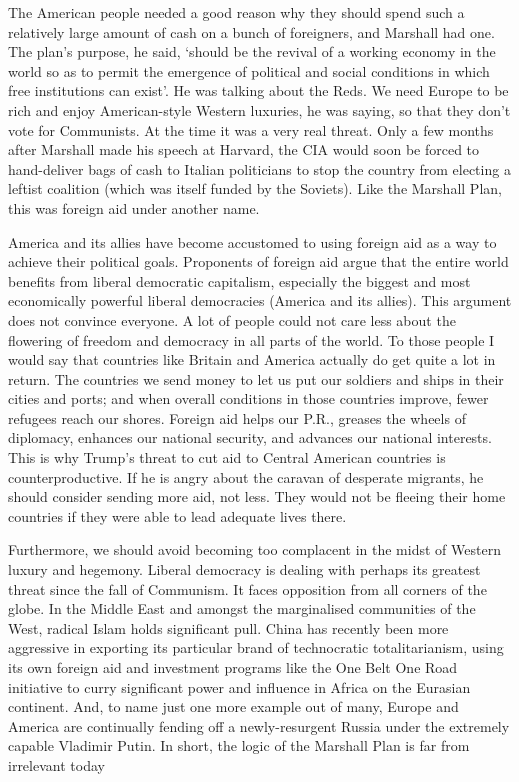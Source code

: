    The American people needed a good reason why they should spend such a
   relatively large amount of cash on a bunch of foreigners, and Marshall
   had one. The plan's purpose, he said, `should be the revival of a
   working economy in the world so as to permit the emergence of political
   and social conditions in which free institutions can exist'. He was
   talking about the Reds. We need Europe to be rich and enjoy
   American-style Western luxuries, he was saying, so that they don't vote
   for Communists. At the time it was a very real threat. Only a few
   months after Marshall made his speech at Harvard, the CIA would soon be
   forced to hand-deliver bags of cash to Italian politicians to stop the
   country from electing a leftist coalition (which was itself funded by
   the Soviets). Like the Marshall Plan, this was foreign aid under
   another name.

   America and its allies have become accustomed to using foreign aid as a
   way to achieve their political goals. Proponents of foreign aid argue
   that the entire world benefits from liberal democratic capitalism,
   especially the biggest and most economically powerful liberal
   democracies (America and its allies). This argument does not convince
   everyone. A lot of people could not care less about the flowering of
   freedom and democracy in all parts of the world. To those people I
   would say that countries like Britain and America actually do get quite
   a lot in return. The countries we send money to let us put our soldiers
   and ships in their cities and ports; and when overall conditions in
   those countries improve, fewer refugees reach our shores. Foreign aid
   helps our P.R., greases the wheels of diplomacy, enhances our national
   security, and advances our national interests. This is why Trump's
   threat to cut aid to Central American countries is counterproductive.
   If he is angry about the caravan of desperate migrants, he should
   consider sending more aid, not less. They would not be fleeing their
   home countries if they were able to lead adequate lives there.

   Furthermore, we should avoid becoming too complacent in the midst of
   Western luxury and hegemony. Liberal democracy is dealing with perhaps
   its greatest threat since the fall of Communism. It faces opposition
   from all corners of the globe. In the Middle East and amongst the
   marginalised communities of the West, radical Islam holds significant
   pull. China has recently been more aggressive in exporting its
   particular brand of technocratic totalitarianism, using its own foreign
   aid and investment programs like the One Belt One Road initiative to
   curry significant power and influence in Africa on the Eurasian
   continent. And, to name just one more example out of many, Europe and
   America are continually fending off a newly-resurgent Russia under the
   extremely capable Vladimir Putin. In short, the logic of the Marshall
   Plan is far from irrelevant today


